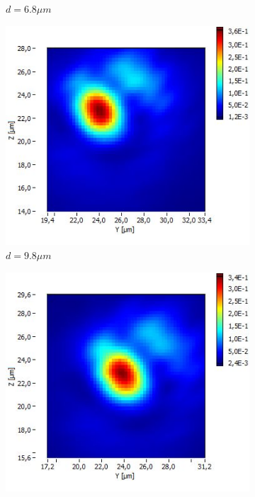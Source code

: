 \documentclass[a4paper,11pt]{article}
\begin{document}
\begin{figure}[htb]
\begin{subfigure}[b]{.20\linewidth}
    \caption{$d=6.8\mu m$}
  \end{subfigure}
  \begin{subfigure}[b]{.20\linewidth}
    \centering
    \includegraphics[width=\textwidth]{Fibre5/scan_025_g1.jpg}
    \caption{$d=9.8\mu m$}
  \end{subfigure}
  \begin{subfigure}[b]{.20\linewidth}
    \centering
    \includegraphics[width=\textwidth]{Fibre5/scan_026_g1.jpg}

\end{subfigure}
\end{figure}
\end{document}
